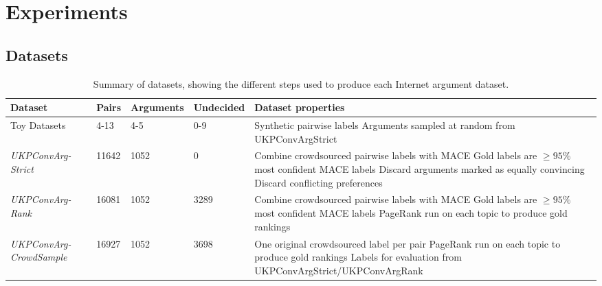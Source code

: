 \section{Experiments}\label{sec:expts}

\subsection{Datasets}
\begin{table}[h]
\small
  \begin{tabularx}{\textwidth}{ p{2.0cm} | p{0.6cm} p{1.2cm} p{1.2cm} X }
  Dataset & Pairs & Arguments & Undecided & Dataset properties \\\hline\hline
  Toy Datasets & 4-13 & 4-5 & 0-9 & Synthetic pairwise labels
  \newline Arguments sampled at random from UKPConvArgStrict\\  
  \hline\emph{UKPConvArg-Strict} &
  11642 &
  1052 & 
  0 &
  Combine crowdsourced pairwise labels with MACE \newline
  Gold labels are $\ge 95\%$ most confident MACE labels \newline
  Discard arguments marked as equally convincing \newline
  Discard conflicting preferences \\
  \hline\emph{UKPConvArg-Rank} &
  16081 &
  1052 &
  3289 &
  Combine crowdsourced pairwise labels with MACE \newline
  Gold labels are $\ge 95\%$ most confident MACE labels \newline
  PageRank run on each topic to produce gold rankings \\  
  \hline\emph{UKPConvArg-CrowdSample} &
  16927 & 
  1052 &
  3698 &
  One original crowdsourced label per pair\newline
  PageRank run on each topic to produce gold rankings \newline
  Labels for evaluation from UKPConvArgStrict/UKPConvArgRank
  \end{tabularx}
  \caption{\label{tab:expt_data} Summary of datasets, showing the different steps used to produce each Internet argument dataset.}
\end{table}

